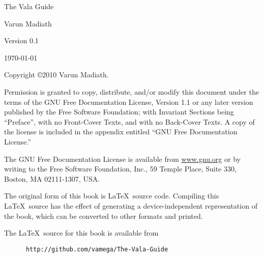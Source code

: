 \documentclass[openany]{book}
\begin{document}
\pagebreak
\thispagestyle{empty}

\begin{flushright}
\vspace*{2.5in}

{\huge The Vala Guide}

\vspace{1in}

{\Large
Varun Madiath
}


\vspace{1in}

{\Large Version 0.1}

{\small \today}

\vfill

\end{flushright}

\pagebreak
\thispagestyle{empty}

Copyright \copyright 2010 Varun Madiath.

\vspace{0.25in}

Permission is granted to copy, distribute, and/or modify this document
under the terms of the GNU Free Documentation License, Version 1.1 or
any later version published by the Free Software Foundation; with
Invariant Sections being ``Preface'', with no Front-Cover Texts, and
with no Back-Cover Texts.  A copy of the license is included in the
appendix entitled ``GNU Free Documentation License.''

The GNU Free Documentation License is available from \url{www.gnu.org}
or by writing to the Free Software Foundation, Inc., 59 Temple Place,
Suite 330, Boston, MA 02111-1307, USA.

The original form of this book is \LaTeX\ source code.  Compiling this
\LaTeX\ source has the effect of generating a device-independent
representation of the book, which can be converted to other formats
and printed.

The \LaTeX\ source for this book is available from

\begin{verbatim}
      http://github.com/vamega/The-Vala-Guide
\end{verbatim}

\vspace{0.25in}


\end{document}
